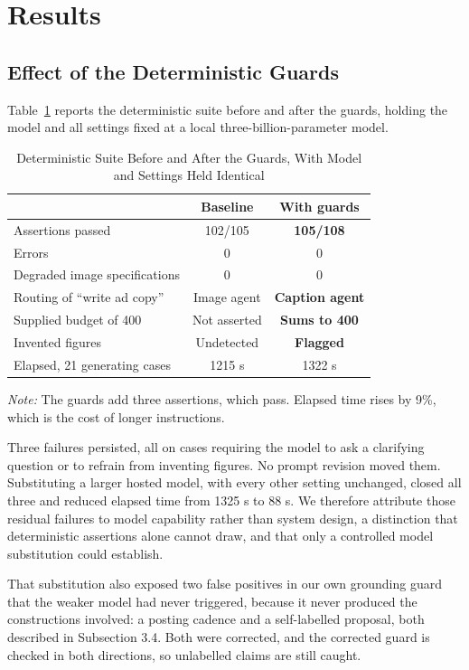 \documentclass[9pt,twocolumn]{extarticle}
\newcommand{\tabref}[1]{Table~\ref{#1}}
\newcommand{\tabnote}[1]{\par\vspace{2pt}\footnotesize\textit{Note:} #1}
\begin{document}
\section{Results}

\subsection{Effect of the Deterministic Guards}
\tabref{tab:rq1} reports the deterministic suite before and after the guards,
holding the model and all settings fixed at a local three-billion-parameter
model.

\begin{table}[t]
\centering
\caption{Deterministic Suite Before and After the Guards, With Model and
Settings Held Identical}
\label{tab:rq1}
\small
\begin{tabular}{@{}lcc@{}}
\toprule
 & Baseline & With guards\\
\midrule
Assertions passed             & 102/105 & \textbf{105/108}\\
Errors                        & 0 & 0\\
Degraded image specifications & 0 & 0\\
Routing of ``write ad copy''  & Image agent & \textbf{Caption agent}\\
Supplied budget of 400        & Not asserted & \textbf{Sums to 400}\\
Invented figures              & Undetected & \textbf{Flagged}\\
Elapsed, 21 generating cases  & 1215 s & 1322 s\\
\bottomrule
\end{tabular}
\tabnote{The guards add three assertions, which pass. Elapsed time rises by
9\%, which is the cost of longer instructions.}
\end{table}

Three failures persisted, all on cases requiring the model to ask a clarifying
question or to refrain from inventing figures. No prompt revision moved them.
Substituting a larger hosted model, with every other setting unchanged, closed
all three and reduced elapsed time from 1325 s to 88 s. We therefore attribute
those residual failures to model capability rather than system design, a
distinction that deterministic assertions alone cannot draw, and that only a
controlled model substitution could establish.

That substitution also exposed two false positives in our own grounding guard
that the weaker model had never triggered, because it never produced the
constructions involved: a posting cadence and a self-labelled proposal, both
described in Subsection 3.4. Both were corrected, and the corrected guard is
checked in both directions, so unlabelled claims are still caught.
\end{document}
